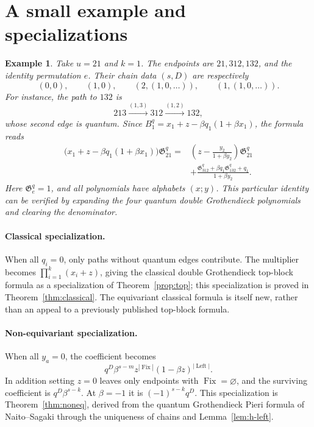 \documentclass[11pt]{article}
\newtheorem{example}[proposition]{Example}
\newcommand{\G}{\mathfrak{G}}
\newcommand{\Fix}{\operatorname{Fix}}
\newcommand{\Left}{\operatorname{Left}}
\begin{document}
\section{A small example and specializations}

\begin{example}\label{ex:s1}
Take $u=21$ and $k=1$. The endpoints are $21,312,132$, and the
identity permutation $e$. Their chain data $(s,D)$ are respectively
\[
 (0,0),\qquad(1,0),\qquad(2,(1,0,\ldots)),\qquad
 (1,(1,0,\ldots)).
\]
For instance, the path to $132$ is
\[
 213\xrightarrow{(1,3)}312\xrightarrow{(1,2)}132,
\]
whose second edge is quantum. Since
$B_1^q=x_1+z-\beta q_1(1+\beta x_1)$,
the formula reads
\begin{equation}\label{eq:example}
\begin{split}
 \bigl(x_1+z-\beta q_1(1+\beta x_1)\bigr)\G_{21}^q
 ={}&
 \left(z-\frac{y_2}{1+\beta y_2}\right)\G_{21}^q\\
 &+\frac{\G_{312}^q+\beta q_1\G_{132}^q+q_1}
              {1+\beta y_2}.
\end{split}
\end{equation}
Here $\G_e^q=1$, and all polynomials have alphabets $(x;y)$.
This particular identity can be verified by expanding the four
quantum double Grothendieck polynomials and clearing the denominator.
\end{example}

\paragraph{Classical specialization.}
When all $q_i=0$, only paths without quantum edges contribute.
The multiplier becomes $\prod_{i=1}^k(x_i+z)$, giving the
classical double Grothendieck top-block formula as a specialization
of Theorem~\ref{prop:top}; this specialization is proved in
Theorem~\ref{thm:classical}. The equivariant classical formula is
itself new, rather than an appeal to a previously published top-block
formula.

\paragraph{Non-equivariant specialization.}
When all $y_a=0$, the coefficient becomes
\[
 q^D\beta^{s-m}z^{|\Fix|}(1-\beta z)^{|\Left|}.
\]
In addition setting $z=0$ leaves only endpoints with $\Fix=\varnothing$,
and the surviving coefficient is $q^D\beta^{s-k}$.
At $\beta=-1$ it is $(-1)^{s-k}q^D$.
This specialization is Theorem~\ref{thm:noneq}, derived from the quantum
Grothendieck Pieri formula of Naito--Sagaki \cite{naito2024pieri}
through the uniqueness of chains and Lemma~\ref{lem:h-left}.
\end{document}
